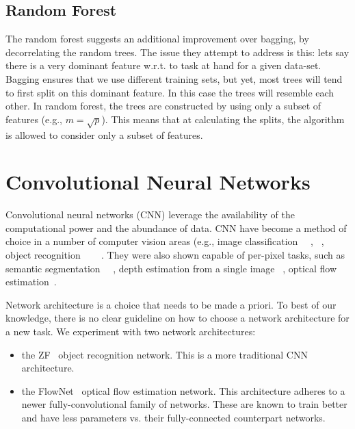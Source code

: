 \subsection{Random Forest}
The random forest suggests an additional improvement over bagging, by
decorrelating the random trees.  The issue they attempt to address is
this: lets say there is a very dominant feature w.r.t. to task at hand
for a given data-set.  Bagging ensures that we use different training
sets, but yet, most trees will tend to first split on this dominant
feature.  In this case the trees will resemble each other.  In random
forest, the trees are constructed by using only a subset of features
(e.g., $m = \sqrt{p}$).  This means that at calculating the splits,
the algorithm is allowed to consider only a subset of features.

\section{Convolutional Neural Networks}

Convolutional neural networks (CNN) leverage the availability of the
computational power and the abundance of data.  CNN have become a
method of choice in a number of computer vision areas (e.g., image
classification~\cite{krizhevsky2012imagenet} ~\cite{simonyan2014very},
~\cite{szegedy2015going}, object recognition
~\cite{sermanet2013overfeat}~\cite{girshick2014rich}
~\cite{he2014spatial}.  They were also shown capable of per-pixel
tasks, such as semantic segmentation
~\cite{ning2005toward}~\cite{gupta2014learning}, depth estimation from
a single image ~\cite{liu2016learning}, optical flow
estimation~\cite{fischer2015flownet}.

Network architecture is a choice that needs to be made a priori.  To
best of our knowledge, there is no clear guideline on how to choose a
network architecture for a new task.  We experiment with two network architectures:

\begin{itemize}
\item the ZF~\cite{DBLP:journals/corr/ZeilerF13} object recognition
  network.  This is a more traditional CNN architecture.
\item the FlowNet~\cite{fischer2015flownet} optical flow estimation
  network.  This architecture adheres to a newer fully-convolutional
  family of networks.  These are known to train better and have less
  parameters vs. their fully-connected counterpart networks.
\end{itemize}

